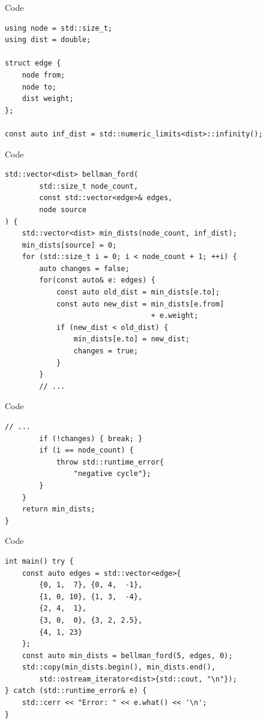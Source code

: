 \begin{frame}[fragile]{Code}
\begin{lstlisting}[basicstyle=\footnotesize]
using node = std::size_t;
using dist = double;

struct edge {
    node from;
    node to;
    dist weight;
};

const auto inf_dist = std::numeric_limits<dist>::infinity();
\end{lstlisting}
\end{frame}

\begin{frame}[fragile]{Code}

\begin{lstlisting}[basicstyle=\footnotesize]
std::vector<dist> bellman_ford(
        std::size_t node_count,
        const std::vector<edge>& edges,
        node source
) {
    std::vector<dist> min_dists(node_count, inf_dist);
    min_dists[source] = 0;
    for (std::size_t i = 0; i < node_count + 1; ++i) {
        auto changes = false;
        for(const auto& e: edges) {
            const auto old_dist = min_dists[e.to];
            const auto new_dist = min_dists[e.from]
                                  + e.weight;
            if (new_dist < old_dist) {
                min_dists[e.to] = new_dist;
                changes = true;
            }
        }
        // ...
\end{lstlisting}


\end{frame}

\begin{frame}[fragile]{Code}

\begin{lstlisting}[basicstyle=\footnotesize]
        // ...
        if (!changes) { break; }
        if (i == node_count) {
            throw std::runtime_error{
                "negative cycle"};
        }
    }
    return min_dists;
}
\end{lstlisting}

\end{frame}

\begin{frame}[fragile]{Code}

\begin{lstlisting}[basicstyle=\footnotesize]
int main() try {
    const auto edges = std::vector<edge>{
        {0, 1,  7}, {0, 4,  -1},
        {1, 0, 10}, {1, 3,  -4},
        {2, 4,  1},
        {3, 0,  0}, {3, 2, 2.5},
        {4, 1, 23}
    };
    const auto min_dists = bellman_ford(5, edges, 0);
    std::copy(min_dists.begin(), min_dists.end(),
        std::ostream_iterator<dist>{std::cout, "\n"});
} catch (std::runtime_error& e) {
    std::cerr << "Error: " << e.what() << '\n';
}
\end{lstlisting}

\end{frame}

